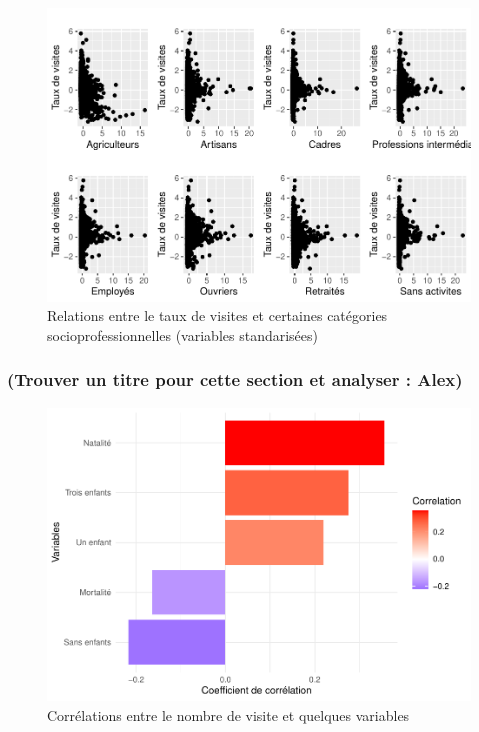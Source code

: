 \documentclass[
]{article}
\begin{document}
\begin{figure}

{\centering \includegraphics{4_Analyse_Descriptive_files/figure-latex/unnamed-chunk-10-1} 

}

\caption{Relations entre le taux de visites et certaines catégories socioprofessionnelles (variables standarisées)}\label{fig:unnamed-chunk-10}
\end{figure}

\hypertarget{trouver-un-titre-pour-cette-section-et-analyser-alex}{%
\subsubsection{(Trouver un titre pour cette section et analyser :
Alex)}\label{trouver-un-titre-pour-cette-section-et-analyser-alex}}

\begin{figure}

{\centering \includegraphics{4_Analyse_Descriptive_files/figure-latex/unnamed-chunk-11-1} 

}

\caption{Corrélations entre le nombre de visite et quelques variables}\label{fig:unnamed-chunk-11}
\end{figure}
\end{document}
